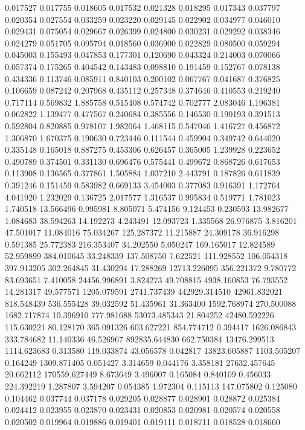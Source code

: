 0.017527
0.017755
0.018605
0.017532
0.021328
0.018295
0.017343
0.037797
0.020354
0.027554
0.033259
0.023220
0.029145
0.022902
0.034977
0.046010
0.029431
0.075054
0.029667
0.026399
0.024800
0.030231
0.029292
0.038346
0.024279
0.051705
0.095794
0.018560
0.036900
0.022829
0.080500
0.059294
0.045003
0.155493
0.047853
0.177301
0.120690
0.043324
0.214003
0.070066
0.057374
0.175265
0.404542
0.143483
0.098810
0.191459
0.152767
0.078138
0.434336
0.113746
0.085911
0.840103
0.200102
0.067767
0.041687
0.376825
0.106659
0.087242
0.207968
0.435112
0.257348
0.374646
0.410553
0.219240
0.717114
0.569832
1.885758
0.515408
0.574742
0.702777
2.083046
1.196381
0.062822
1.139477
0.477567
0.240684
0.385556
0.146530
0.190193
0.391513
0.592804
0.820885
0.978107
1.982064
1.468115
0.547046
1.416727
0.456872
1.306870
1.670375
0.190630
0.723446
0.111544
0.459904
0.349742
0.644020
0.335148
0.165018
0.887275
0.453306
0.626457
0.365005
1.239928
0.223652
0.490789
0.374501
0.331130
0.696476
0.575441
0.499672
0.868726
0.617653
0.113908
0.136565
0.377861
1.505884
1.037210
2.443791
0.187826
0.611839
0.391246
0.151459
0.583982
0.669133
3.454003
0.377083
0.916391
1.172764
4.041920
1.232029
0.136725
2.017577
1.316537
0.995834
0.519771
1.781023
1.740518
13.566496
0.995981
8.805071
5.474156
9.124453
0.230593
13.982677
1.084683
38.594263
14.192273
4.243491
12.093723
1.335568
26.976875
3.816201
47.501017
11.084016
75.034267
125.287372
11.215887
24.309178
36.916298
0.591385
25.772383
216.353407
34.202550
5.050247
169.165017
12.824589
52.959899
384.010645
33.248339
137.508750
7.622521
111.928552
106.054318
397.913205
302.264845
31.430294
17.288269
12713.226095
356.221372
9.780772
83.693651
7.410058
24456.996891
3.824273
49.708815
4938.160853
76.793552
14.281317
49.577571
1205.079591
2741.737439
442929.314510
42961.832021
818.548439
536.555428
39.032592
51.435961
31.363400
1592.768974
270.500088
1682.717874
10.396910
777.981688
53073.485343
21.804252
42480.592226
115.630221
80.128170
365.091326
603.627221
854.774712
0.394417
1626.086843
333.784682
11.140336
46.526967
892835.644830
662.750384
13476.299513
1114.623683
0.313580
119.033874
43.056578
0.042817
13823.605887
1103.505207
0.164249
1309.871405
0.051427
3.314659
0.044176
3.358181
27632.457645
20.662112
170559.627449
8.673649
3.496007
0.165084
0.840109
0.456033
224.392219
1.287807
3.594207
0.054385
1.972304
0.115113
147.075802
0.125080
0.104462
0.037744
0.037178
0.029205
0.028877
0.028901
0.028872
0.025384
0.024412
0.023955
0.023870
0.023431
0.020853
0.020981
0.020574
0.020558
0.020502
0.019964
0.019886
0.019401
0.019111
0.018711
0.018528
0.018660
